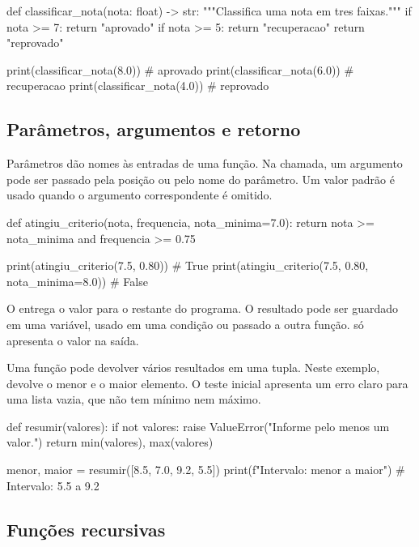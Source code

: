 \begin{exemplo}
def classificar_nota(nota: float) -> str:
    """Classifica uma nota em tres faixas."""
    if nota >= 7:
        return "aprovado"
    if nota >= 5:
        return "recuperacao"
    return "reprovado"

print(classificar_nota(8.0))  # aprovado
print(classificar_nota(6.0))  # recuperacao
print(classificar_nota(4.0))  # reprovado
\end{exemplo}

\subsection{Parâmetros, argumentos e retorno}

Parâmetros dão nomes às entradas de uma função. Na chamada, um argumento pode ser passado pela posição ou pelo nome do parâmetro. Um valor padrão é usado quando o argumento correspondente é omitido.

\begin{exemplo}
def atingiu_criterio(nota, frequencia, nota_minima=7.0):
    return nota >= nota_minima and frequencia >= 0.75

print(atingiu_criterio(7.5, 0.80))  # True
print(atingiu_criterio(7.5, 0.80, nota_minima=8.0))  # False
\end{exemplo}

O  entrega o valor para o restante do programa. O resultado pode ser guardado em uma variável, usado em uma condição ou passado a outra função.  só apresenta o valor na saída.

Uma função pode devolver vários resultados em uma tupla. Neste exemplo,  devolve o menor e o maior elemento. O teste inicial apresenta um erro claro para uma lista vazia, que não tem mínimo nem máximo.

\begin{exemplo}
def resumir(valores):
    if not valores:
        raise ValueError("Informe pelo menos um valor.")
    return min(valores), max(valores)

menor, maior = resumir([8.5, 7.0, 9.2, 5.5])
print(f"Intervalo: {menor} a {maior}")  # Intervalo: 5.5 a 9.2
\end{exemplo}

\subsection{Funções recursivas}
\label{sec:recursao}

